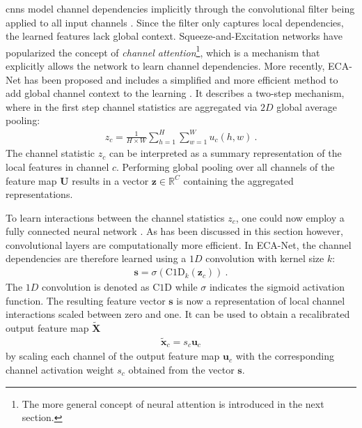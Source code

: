 \glspl{cnn} model channel dependencies implicitly through the convolutional filter being applied to all input channels \cite{huSqueezeandExcitationNetworks2019}. Since the filter only captures local dependencies, the learned features lack global context. Squeeze-and-Excitation networks \cite{huSqueezeandExcitationNetworks2019} have popularized the concept of \emph{channel attention}\footnote{The more general concept of neural attention is introduced in the next section.}, which is a mechanism that explicitly allows the network to learn channel dependencies. More recently, ECA-Net has been proposed and includes a simplified and more efficient method to add global channel context to the learning \cite{wangECANetEfficientChannel2020}. It describes a two-step mechanism, where in the first step channel statistics are aggregated via $2D$ global average pooling:
\begin{gather}\label{eq:avg_pool}
    z_c = \frac{1}{H \times W} \sum_{h=1}^H \sum_{w=1}^W u_c(h, w)~.
\end{gather}
The channel statistic $z_c$ can be interpreted as a summary representation of the local features in channel $c$. Performing global pooling over all channels of the feature map $\mathbf U$ results in a vector $\mathbf z \in \mathbb R^C$ containing the aggregated representations.

To learn interactions between the channel statistics $z_c$, one could now employ a fully connected neural network \cite{huSqueezeandExcitationNetworks2019}. As has been discussed in this section however, convolutional layers are computationally more efficient. In ECA-Net, the channel dependencies are therefore learned using a $1D$ convolution with kernel size $k$:
\begin{gather}\label{eq:eca}
    \mathbf s = \sigma(\text{C1D}_k(\mathbf z_c))~.
\end{gather}
The $1D$ convolution is denoted as $\text{C1D}$ while $\sigma$ indicates the sigmoid activation function. The resulting feature vector $\mathbf s$ is now a representation of local channel interactions scaled between zero and one. It can be used to obtain a recalibrated output feature map $\tilde{\mathbf{X}}$
\begin{gather}\label{eq:eca_output}
    \tilde{\mathbf{x}}_c = s_c \mathbf u_c
\end{gather}
by scaling each channel of the output feature map $\mathbf u_c$ with the corresponding channel activation weight $s_c$ obtained from the vector $\mathbf s$.

